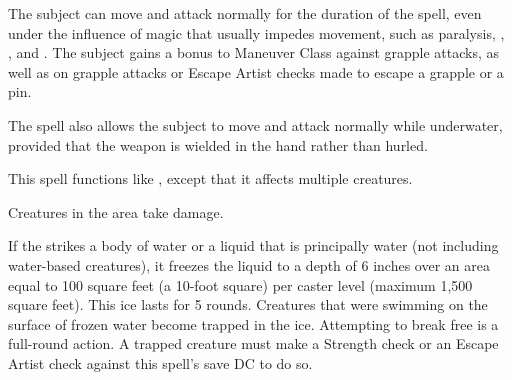 \spellrng{\rngtouch}
\spelldur{\durshort}
\begin{spelleffect}
  The subject can move and attack normally for the duration of the spell, even under the influence of magic that usually impedes movement, such as paralysis, , , and . The subject gains a  bonus to Maneuver Class against grapple attacks, as well as on grapple attacks or Escape Artist checks made to escape a grapple or a pin.
  \par The spell also allows the subject to move and attack normally while underwater, provided that the weapon is wielded in the hand rather than hurled.
\end{spelleffect}

\spellrng{\rngmed}
\begin{spelleffect}
  This spell functions like , except that it affects multiple creatures.
\end{spelleffect}

\spellrng{\rngmed}
\begin{spelleffect}
  Creatures in the area take damage. 
  
  If the  strikes a body of water or a liquid that is principally water (not including water-based creatures), it freezes the liquid to a depth of 6 inches over an area equal to 100 square feet (a 10-foot square) per caster level (maximum 1,500 square feet). This ice lasts for 5 rounds. Creatures that were swimming on the surface of frozen water become trapped in the ice. Attempting to break free is a full-round action. A trapped creature must make a Strength check or an Escape Artist check against this spell's save DC to do so.
\end{spelleffect}

